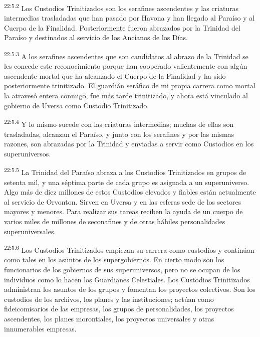 \par
\textsuperscript{22:5.2} Los Custodios Trinitizados son los serafines ascendentes y las criaturas intermedias trasladadas que han pasado por Havona y han llegado al Paraíso y al Cuerpo de la Finalidad. Posteriormente fueron abrazados por la Trinidad del Paraíso y destinados al servicio de los Ancianos de los Días.

\par
\textsuperscript{22:5.3} A los serafines ascendentes que son candidatos al abrazo de la Trinidad se les concede este reconocimiento porque han cooperado valientemente con algún ascendente mortal que ha alcanzado el Cuerpo de la Finalidad y ha sido posteriormente trinitizado. El guardián seráfico de mi propia carrera como mortal la atravesó entera conmigo, fue más tarde trinitizado, y ahora está vinculado al gobierno de Uversa como Custodio Trinitizado.

\par
\textsuperscript{22:5.4} Y lo mismo sucede con las criaturas intermedias; muchas de ellas son trasladadas, alcanzan el Paraíso, y junto con los serafines y por las mismas razones, son abrazadas por la Trinidad y enviadas a servir como Custodios en los superuniversos.

\par
\textsuperscript{22:5.5} La Trinidad del Paraíso abraza a los Custodios Trinitizados en grupos de setenta mil, y una séptima parte de cada grupo es asignada a un superuniverso. Algo más de diez millones de estos Custodios elevados y fiables están actualmente al servicio de Orvonton. Sirven en Uversa y en las esferas sede de los sectores mayores y menores. Para realizar sus tareas reciben la ayuda de un cuerpo de varios miles de millones de seconafines y de otras hábiles personalidades superuniversales.

\par
\textsuperscript{22:5.6} Los Custodios Trinitizados empiezan su carrera como custodios y continúan como tales en los asuntos de los supergobiernos. En cierto modo son los funcionarios de los gobiernos de sus superuniversos, pero no se ocupan de los individuos como lo hacen los Guardianes Celestiales. Los Custodios Trinitizados administran los asuntos de los grupos y fomentan los proyectos colectivos. Son los custodios de los archivos, los planes y las instituciones; actúan como fideicomisarios de las empresas, los grupos de personalidades, los proyectos ascendentes, los planes morontiales, los proyectos universales y otras innumerables empresas.

